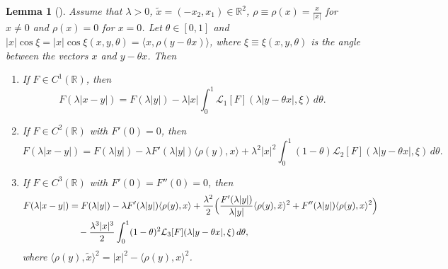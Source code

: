 \documentclass[reqno]{amsart}
\newtheorem{lemma}[theorem]{Lemma}
\numberwithin{equation}{section}
\begin{document}
\begin{lemma}[{\cite[Lemma 3.5]{LSY21}}]\label{taylor}
Assume that $\lambda>0$,  $\tilde{x}=(-x_2,x_1) \in \mathbb{R}^2$, $ \rho \equiv \rho(x)=\frac{x}{|x|}$ for $x\neq 0$ and $\rho(x)=0$ for $x=0$.
Let $\theta\in [0,1]$ and $ |x| \cos\xi=|x| \cos\xi(x, y, \theta )= \langle x, \rho(y-\theta x)\rangle$,
 where $\xi\equiv \xi(x, y, \theta )$ is the angle between the vectors $x$ and $y-\theta x$.
Then
\begin{enumerate}
\item[(i)] If $F \in C^{1}(\mathbb{R})$, then
$$
F(\lambda|x-y|) = F(\lambda|y|) - \lambda |x| \int_{0}^{1} \mathcal{L}_{1}[F](\lambda|y-\theta x|, \xi) \, d\theta.
$$

\item[(ii)] If $F \in C^{2}(\mathbb{R})$ with $F'(0) = 0$, then
$$
F(\lambda|x-y|)
= F(\lambda|y|) - \lambda F'(\lambda|y|) \langle \rho(y), x \rangle
 + \lambda^{2}|x|^{2} \int_{0}^{1} (1-\theta) \mathcal{L}_{2}[F](\lambda|y-\theta x|, \xi) \, d\theta.
$$

\item[(iii)] If $F \in C^{3}(\mathbb{R})$ with $F'(0)=F''(0)=0$, then
$$
\begin{aligned}
F(\lambda|x-y|)
&= F(\lambda|y|) - \lambda F'(\lambda|y|) \langle \rho(y), x \rangle
 + \frac{\lambda^{2}}{2} \Bigl( \frac{F'(\lambda|y|)}{\lambda|y|} \langle \rho(y), \tilde{x}\rangle^{2}
+ F''(\lambda|y|) \langle \rho(y), x\rangle^{2} \Bigr) \\
&\quad - \frac{\lambda^{3}|x|^{3}}{2} \int_{0}^{1} (1-\theta)^{2} \mathcal{L}_{3}[F](\lambda|y-\theta x|, \xi) \, d\theta,
\end{aligned}
$$
where $\langle \rho(y), \tilde{x}\rangle^{2} = |x|^{2} - \langle \rho(y), x\rangle^{2}$.


\end{enumerate}
\end{lemma}
\end{document}
